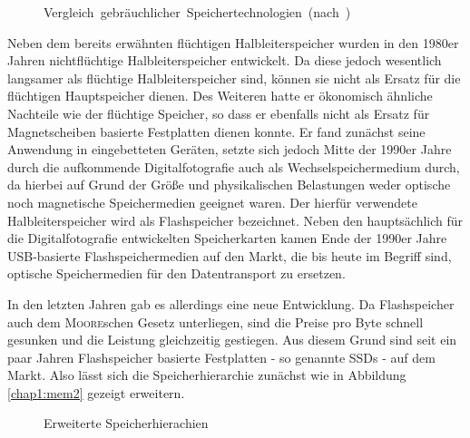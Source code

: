 \begin{figure}[t!]\centering\vspace{5mm}
    \caption[Vergleich gebräuchlicher Speichertechnologien]{\mbox{Vergleich gebräuchlicher Speichertechnologien (nach \textcite[245]{info2})}}
    \label{img:gab}
\end{figure}

Neben dem bereits erwähnten flüchtigen Halbleiterspeicher wurden in den 1980er Jahren nichtflüchtige Halbleiterspeicher entwickelt. Da diese jedoch wesentlich
langsamer als flüchtige Halbleiterspeicher sind, können sie nicht als Ersatz für die flüchtigen Hauptspeicher dienen. Des Weiteren hatte er ökonomisch ähnliche
Nachteile wie der flüchtige Speicher, so dass er ebenfalls nicht als Ersatz für Magnetscheiben basierte Festplatten dienen konnte. Er fand zunächst seine
Anwendung in eingebetteten Geräten, setzte sich jedoch Mitte der 1990er Jahre durch die aufkommende Digitalfotografie auch als Wechselspeichermedium durch, da
hierbei auf Grund der Größe und physikalischen Belastungen weder optische noch magnetische Speichermedien geeignet waren. Der hierfür verwendete
Halbleiterspeicher wird als Flashspeicher bezeichnet. Neben den hauptsächlich für die Digitalfotografie entwickelten Speicherkarten kamen Ende der 1990er Jahre
USB-basierte Flashspeichermedien auf den Markt, die bis heute im Begriff sind, optische Speichermedien für den Datentransport zu ersetzen.

In den letzten Jahren gab es allerdings eine neue Entwicklung. Da Flashspeicher auch dem \textsc{Moore}schen Gesetz unterliegen, sind die Preise pro Byte
schnell gesunken und die Leistung gleichzeitig gestiegen. Aus diesem Grund sind seit ein paar Jahren Flashspeicher basierte Festplatten - so genannte \acp{SSD} - auf dem
Markt. Also lässt sich die Speicherhierarchie zunächst wie in Abbildung \ref{chap1:mem2} gezeigt erweitern.

\begin{figure}[t]\centering
	\hfill
	\caption[Erweiterte Speicherhierachien]{Erweiterte Speicherhierachien}
\end{figure}

